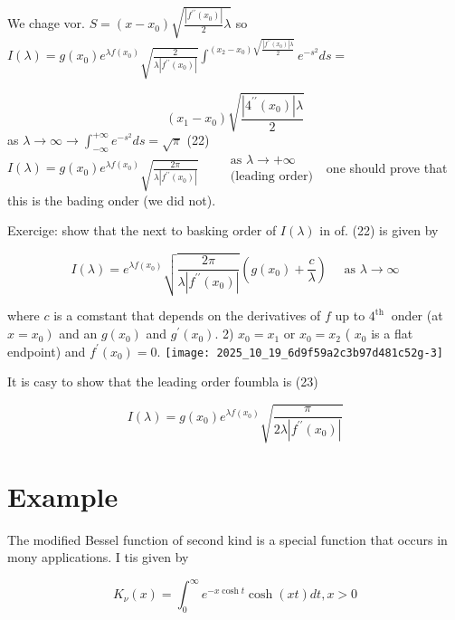 We chage vor. $S=\left(x-x_{0}\right) \sqrt{\frac{\left|f^{\prime \prime}\left(x_{0}\right)\right|}{2} \lambda}$ so
$I(\lambda)=g\left(x_{0}\right) e^{\lambda f\left(x_{0}\right)} \sqrt{\frac{2}{\lambda\left|f^{\prime \prime}\left(x_{0}\right)\right|}} \int^{\left(x_{2}-x_{0}\right) \sqrt{\frac{\left|f^{\prime \prime}\left(x_{0}\right)\right| \lambda}{2}}} e^{-s^{2}} d s=$

$$ \left(x_{1}-x_{0}\right) \sqrt{\frac{\left|4^{\prime \prime}\left(x_{0}\right)\right| \lambda}{2}} $$ as $\lambda \rightarrow \infty \rightarrow \int_{-\infty}^{+\infty} e^{-s^{2}} d s=\sqrt{\pi}$
(22) $I(\lambda)=g\left(x_{0}\right) e^{\lambda f\left(x_{0}\right)} \sqrt{\frac{2 \pi}{\lambda\left|f^{\prime \prime}\left(x_{0}\right)\right|}} \quad \begin{aligned} & \text { as } \lambda \rightarrow+\infty \\ & \text { (leading order) } \end{aligned}$
one should prove that this is the bading onder (we did not).

Exercige: show that the next to basking order of $I(\lambda)$ in of. (22) is given by

$$ I(\lambda)=e^{\lambda f\left(x_{0}\right)} \sqrt{\frac{2 \pi}{\lambda\left|f^{\prime \prime}\left(x_{0}\right)\right|}}\left(g\left(x_{0}\right)+\frac{c}{\lambda}\right) \quad \text { as } \lambda \rightarrow \infty $$

where $c$ is a comstant that depends on the derivatives of $f$ up to $4^{\text {th }}$ onder (at $\left.x=x_{0}\right)$ and an $g\left(x_{0}\right)$ and $g^{\prime}\left(x_{0}\right)$.
2) $x_{0}=x_{1}$ or $x_{0}=x_{2}$ ( $x_{0}$ is a flat endpoint) and $f^{\prime}\left(x_{0}\right)=0$.
\texttt{[image: 2025\_10\_19\_6d9f59a2c3b97d481c52g-3]}

It is casy to show that the leading order foumbla is
(23)

$$ I(\lambda)=g\left(x_{0}\right) e^{\lambda f\left(x_{0}\right)} \sqrt{\frac{\pi}{2 \lambda\left|f^{\prime \prime}\left(x_{0}\right)\right|}} $$

\section*{Example}
The modified Bessel function of second kind is a special function that occurs in mony applications. I tis given by

$$ K_{\nu}(x)=\int_{0}^{\infty} e^{-x \cosh t} \cosh (x t) d t, x>0 $$

